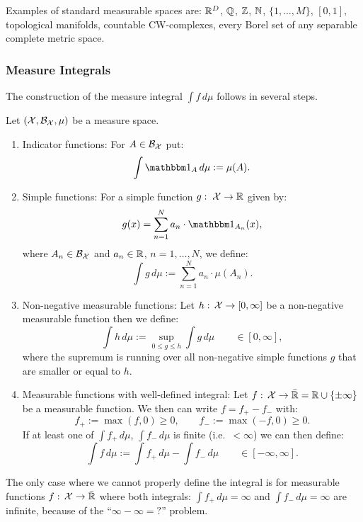 \begin{Eg}
    Examples of standard measurable spaces are: $\mathbb{R}^D$, $\mathbb{Q}$, $\mathbb{Z}$, $\mathbb{N}$, $\{1,\dots,M\}$,  $[0,1]$, topological manifolds, countable CW-complexes, 
    every Borel set of any separable complete metric space.
\end{Eg}



\subsubsection{Measure Integrals}

The construction of the measure integral $\int f\,d\mu$ follows in several steps.

\begin{Construction}
    Let $(\mathcal{X},\mathcal{B}_{\mathcal{X}},\mu)$ be a measure space.
    \begin{enumerate}
        \item Indicator functions: For $A \in \mathcal{B}_{\mathcal{X}}$ put:
            \[\int \I_A\,d\mu := \mu(A).\]
        \item Simple functions: For a simple function $g:\; \mathcal{X} \to \mathbb{R}$ given by: 
            \[ g(x)= \sum_{n=1}^N a_n \cdot \I_{A_n}(x), \]
            where  $A_n \in \mathcal{B}_{\mathcal{X}}$ %
            and $a_n \in \mathbb{R}$, $n=1,\dots,N$, we define: 
            \[ \int g\,d\mu := \sum_{n=1}^N a_n \cdot \mu(A_n). \]
        \item Non-negative measurable functions: Let $h:\, \mathcal{X} \to [0,\infty]$ be a non-negative measurable function then we define:
            \[ \int h\, d\mu := \sup_{0 \le g \le h} \int g \, d\mu \qquad \in [0,\infty], \]
            where the supremum is running over all non-negative simple functions $g$ that are smaller or equal to $h$.
        \item Measurable functions with well-defined integral: Let $f:\, \mathcal{X} \to \bar{\mathbb{R}}=\mathbb{R} \cup \{\pm \infty\}$ be a measurable function. 
            We then can  write  $f=f_+-f_-$ with:
            \[ f_+ := \max(f,0) \ge 0, \qquad f_-:= \max(-f,0) \ge 0.\]
            If at least one of $\int f_+\,d\mu$,  $\int f_-\,d\mu$ is finite (i.e.\ $< \infty$)
            we can then define:
            \[ \int f\, d\mu := \int f_+\,d\mu - \int f_-\,d\mu \qquad \in [-\infty,\infty].\]
        \end{enumerate}
   The only case where we cannot properly define the integral is for measurable functions $f:\, \mathcal{X} \to \bar {\mathbb{R}}$ where both integrals: 
   $\int f_+ \,d\mu = \infty$ and $\int f_-\,d\mu = \infty$ are infinite, because of the ``$\infty - \infty = ?$'' problem.

\end{Construction}

